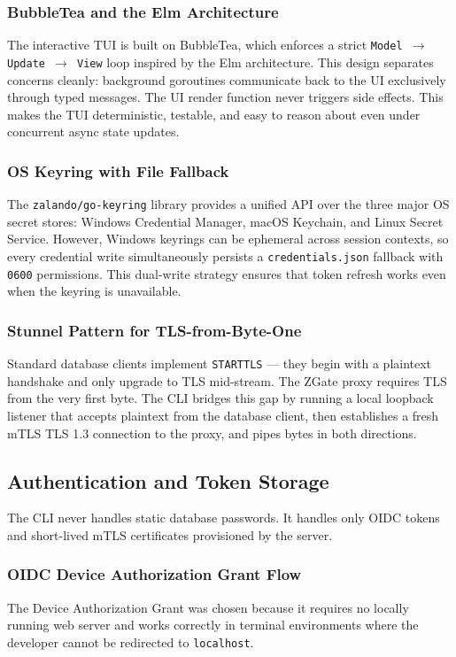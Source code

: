 \subsubsection{BubbleTea and the Elm Architecture}
The interactive TUI is built on BubbleTea, which enforces a strict \texttt{Model $\rightarrow$ Update $\rightarrow$ View} loop inspired by the Elm architecture. This design separates concerns cleanly: background goroutines communicate back to the UI exclusively through typed messages. The UI render function never triggers side effects. This makes the TUI deterministic, testable, and easy to reason about even under concurrent async state updates.

\subsubsection{OS Keyring with File Fallback}
The \texttt{zalando/go-keyring} library provides a unified API over the three major OS secret stores: Windows Credential Manager, macOS Keychain, and Linux Secret Service. However, Windows keyrings can be ephemeral across session contexts, so every credential write simultaneously persists a \texttt{credentials.json} fallback with \texttt{0600} permissions. This dual-write strategy ensures that token refresh works even when the keyring is unavailable.

\subsubsection{Stunnel Pattern for TLS-from-Byte-One}
Standard database clients implement \texttt{STARTTLS} — they begin with a plaintext handshake and only upgrade to TLS mid-stream. The ZGate proxy requires TLS from the very first byte. The CLI bridges this gap by running a local loopback listener that accepts plaintext from the database client, then establishes a fresh mTLS TLS 1.3 connection to the proxy, and pipes bytes in both directions.

\subsection{Authentication and Token Storage}
The CLI never handles static database passwords. It handles only OIDC tokens and short-lived mTLS certificates provisioned by the server.

\subsubsection{OIDC Device Authorization Grant Flow}
The Device Authorization Grant was chosen because it requires no locally running web server and works correctly in terminal environments where the developer cannot be redirected to \texttt{localhost}.

